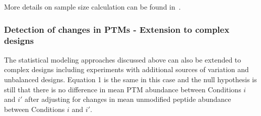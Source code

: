 \documentclass[mcp]{article}
\numberwithin{table}{section}
\begin{document}
More details on sample size calculation can be found in~\cite{oberg_vitek_09a}. 



\subsubsection*{Detection of changes in PTMs - Extension to complex designs}

The statistical modeling approaches discussed above can also be extended to complex designs including experiments with additional sources of variation and unbalanced designs. Equation 1 is the same in this case and the null hypothesis is still that there is no difference in mean PTM abundance between Conditions $i$ and $i'$ after adjusting for changes in mean unmodified peptide abundance between Conditions $i$ and $i'$. 
\end{document}
